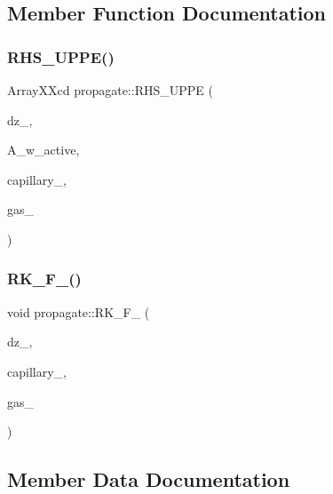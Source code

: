 \subsection{Member Function Documentation}
\mbox{\label{classpropagate_a9f7db42c8dfe3f54c0ac1854c18e89cc}} 
\subsubsection{\texorpdfstring{R\+H\+S\+\_\+\+U\+P\+P\+E()}{RHS\_UPPE()}}
{\footnotesize\ttfamily Array\+X\+Xcd propagate\+::\+R\+H\+S\+\_\+\+U\+P\+PE (\begin{DoxyParamCaption}\item[{double}]{dz\+\_\+,  }\item[{Array\+X\+Xcd}]{A\+\_\+w\+\_\+active,  }\item[{capillary\+\_\+fibre \&}]{capillary\+\_\+,  }\item[{keldysh\+\_\+gas \&}]{gas\+\_\+ }\end{DoxyParamCaption})\hspace{0.3cm}{\ttfamily [private]}}

\mbox{\label{classpropagate_a3bbf66416adb4c799c4664aef6868329}} 
\subsubsection{\texorpdfstring{R\+K\+\_\+\+F\+\_()}{RK\_F\_45()}}
{\footnotesize\ttfamily void propagate\+::\+R\+K\+\_\+\+F\+\_ (\begin{DoxyParamCaption}\item[{double}]{dz\+\_\+,  }\item[{capillary\+\_\+fibre \&}]{capillary\+\_\+,  }\item[{keldysh\+\_\+gas \&}]{gas\+\_\+ }\end{DoxyParamCaption})\hspace{0.3cm}{\ttfamily [private]}}



\subsection{Member Data Documentation}
\mbox{\label{classpropagate_a9cd602470fff3502b3b048f9aa915805}} 
